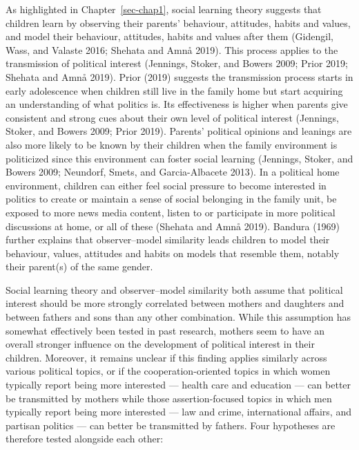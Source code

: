\documentclass[
  letterpaper,
  DIV=11,
  numbers=noendperiod]{scrreprt}
\begin{document}
As highlighted in Chapter~\ref{sec-chap1}, social learning theory
suggests that children learn by observing their parents' behaviour,
attitudes, habits and values, and model their behaviour, attitudes,
habits and values after them (Gidengil, Wass, and Valaste 2016; Shehata
and Amnå 2019). This process applies to the transmission of political
interest (Jennings, Stoker, and Bowers 2009; Prior 2019; Shehata and
Amnå 2019). Prior (2019) suggests the transmission process starts in
early adolescence when children still live in the family home but start
acquiring an understanding of what politics is. Its effectiveness is
higher when parents give consistent and strong cues about their own
level of political interest (Jennings, Stoker, and Bowers 2009; Prior
2019). Parents' political opinions and leanings are also more likely to
be known by their children when the family environment is politicized
since this environment can foster social learning (Jennings, Stoker, and
Bowers 2009; Neundorf, Smets, and Garcia-Albacete 2013). In a political
home environment, children can either feel social pressure to become
interested in politics to create or maintain a sense of social belonging
in the family unit, be exposed to more news media content, listen to or
participate in more political discussions at home, or all of these
(Shehata and Amnå 2019). Bandura (1969) further explains that
observer--model similarity leads children to model their behaviour,
values, attitudes and habits on models that resemble them, notably their
parent(s) of the same gender.

Social learning theory and observer--model similarity both assume that
political interest should be more strongly correlated between mothers
and daughters and between fathers and sons than any other combination.
While this assumption has somewhat effectively been tested in past
research, mothers seem to have an overall stronger influence on the
development of political interest in their children. Moreover, it
remains unclear if this finding applies similarly across various
political topics, or if the cooperation-oriented topics in which women
typically report being more interested --- health care and education ---
can better be transmitted by mothers while those assertion-focused
topics in which men typically report being more interested --- law and
crime, international affairs, and partisan politics --- can better be
transmitted by fathers. Four hypotheses are therefore tested alongside
each other:
\end{document}
